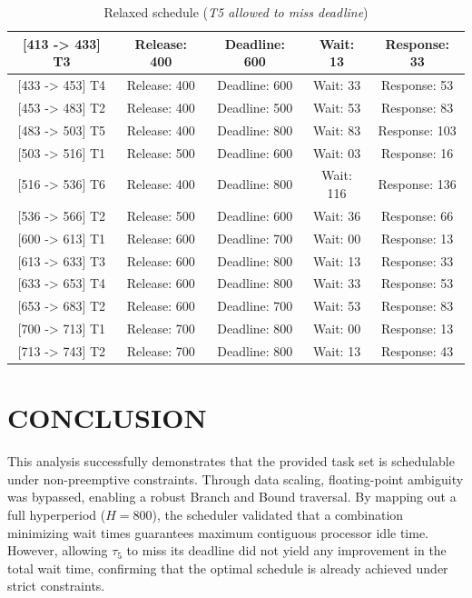 \documentclass{report}
\begin{document}
\begin{table}[H]
\begin{tabular}{| c | c | c | c | c |}
        \hline
        {[413 -> 433]} T3 & Release: 400 & Deadline: 600 & Wait: 13 & Response: 33 \\
        \hline
        {[433 -> 453]} T4 & Release: 400 & Deadline: 600 & Wait: 33 & Response: 53 \\
        \hline
        {[453 -> 483]} T2 & Release: 400 & Deadline: 500 & Wait: 53 & Response: 83 \\
        \hline
        {[483 -> 503]} T5 & Release: 400 & Deadline: 800 & Wait: 83 & Response: 103 \\
        \hline
        {[503 -> 516]} T1 & Release: 500 & Deadline: 600 & Wait: 03 & Response: 16 \\
        \hline
        {[516 -> 536]} T6 & Release: 400 & Deadline: 800 & Wait: 116 & Response: 136 \\
        \hline
        {[536 -> 566]} T2 & Release: 500 & Deadline: 600 & Wait: 36 & Response: 66 \\
        \hline
        {[600 -> 613]} T1 & Release: 600 & Deadline: 700 & Wait: 00 & Response: 13 \\
        \hline
        {[613 -> 633]} T3 & Release: 600 & Deadline: 800 & Wait: 13 & Response: 33 \\
        \hline
        {[633 -> 653]} T4 & Release: 600 & Deadline: 800 & Wait: 33 & Response: 53 \\
        \hline
        {[653 -> 683]} T2 & Release: 600 & Deadline: 700 & Wait: 53 & Response: 83 \\
        \hline
        {[700 -> 713]} T1 & Release: 700 & Deadline: 800 & Wait: 00 & Response: 13 \\
        \hline
        {[713 -> 743]} T2 & Release: 700 & Deadline: 800 & Wait: 13 & Response: 43 \\
        \hline
    \end{tabular}
    \caption{Relaxed schedule (\textit{T5 allowed to miss deadline})}
    \label{tab:relaxed_schedule}
\end{table}

\chapter*{CONCLUSION}

This analysis successfully demonstrates that the provided task set is schedulable under non-preemptive constraints. Through data scaling, floating-point ambiguity was bypassed, enabling a robust Branch and Bound traversal. By mapping out a full hyperperiod ($H=800$), the scheduler validated that a combination minimizing wait times guarantees maximum contiguous processor idle time. However, allowing $\tau_5$ to miss its deadline did not yield any improvement in the total wait time, confirming that the optimal schedule is already achieved under strict constraints.
\end{document}

